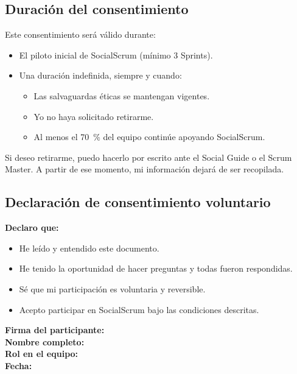 \subsection{Duración del consentimiento}

Este consentimiento será válido durante:

\begin{itemize}
    \item El piloto inicial de SocialScrum (mínimo 3 Sprints).
    \item Una duración indefinida, siempre y cuando:
          \begin{itemize}
              \item Las salvaguardas éticas se mantengan vigentes.
              \item Yo no haya solicitado retirarme.
              \item Al menos el 70~\% del equipo continúe apoyando SocialScrum.
          \end{itemize}
\end{itemize}

Si deseo retirarme, puedo hacerlo por escrito ante el Social Guide o el Scrum Master. A partir de ese momento, mi información dejará de ser recopilada.

\subsection{Declaración de consentimiento voluntario}

\textbf{Declaro que:}

\begin{itemize}
    \item He leído y entendido este documento.
    \item He tenido la oportunidad de hacer preguntas y todas fueron respondidas.
    \item Sé que mi participación es voluntaria y reversible.
    \item Acepto participar en SocialScrum bajo las condiciones descritas.
\end{itemize}

\vspace{1cm}

\noindent
\textbf{Firma del participante:} \underline{\hspace{6cm}} \\[0.5cm]
\textbf{Nombre completo:} \underline{\hspace{6cm}} \\[0.5cm]
\textbf{Rol en el equipo:} \underline{\hspace{6cm}} \\[0.5cm]
\textbf{Fecha:} \underline{\hspace{4cm}} \\[1cm]

